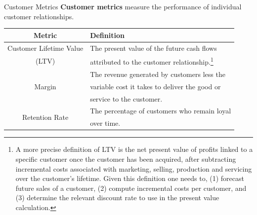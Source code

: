 \documentclass[pdf]{beamer}
\newcommand{\empr}[1]{{\color{franklinblue}\textbf{#1}}}
\theoremstyle{remark}
\theoremstyle{definition}
\begin{document}
\begin{frame}[t]{Customer Metrics}
\empr{Customer metrics} measure the performance of individual customer relationships.\\
\vspace{1.5ex}
\footnotesize
\begin{table}[htbp]
  \centering
  \captionsetup{justification=centering}
    \begin{tabular}{|c|l|}
    \toprule
    Metric & Definition \\
    \midrule
   Customer Lifetime Value  & The present value of the future cash flows \\
    (LTV)  & attributed to the customer relationship.\footnote{A more precise definition of LTV is the net present value of profits linked to a specific customer once the customer has been acquired, after subtracting incremental costs associated with marketing, selling, production and servicing over the customer's lifetime. Given this definition one needs to, (1) forecast future sales of a customer, (2) compute incremental costs per customer, and (3) determine the relevant discount rate to use in the present value calculation.}\\  
    \midrule
   \multirow{3}{*}{Margin} & The revenue generated by customers less the \\
           & variable cost it takes to deliver the good or \\
           & service to the customer.%
            \\ 
    \midrule
   \multirow{2}{*}{Retention Rate} & The percentage of customers who remain loyal \\
    & over time.\\
    \bottomrule
     \end{tabular}%
  \label{tab:custmetrics}%
\end{table}%
\end{frame}
\end{document}
